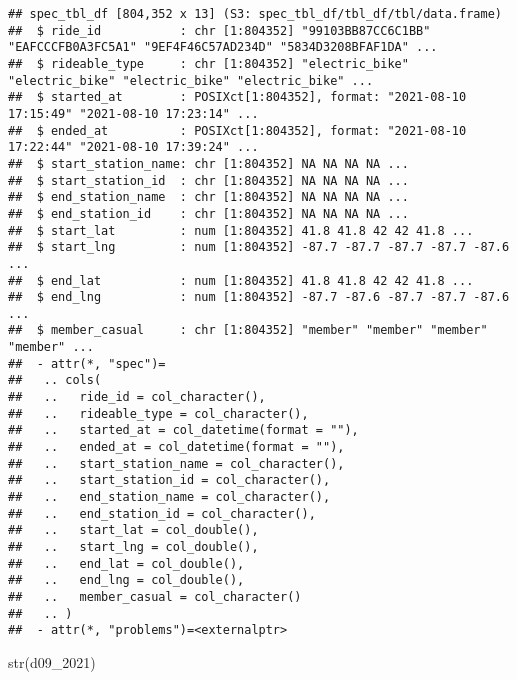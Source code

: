 \documentclass[
]{article}
\newenvironment{Shaded}{\begin{snugshade}}{\end{snugshade}}
\newcommand{\FunctionTok}[1]{\textcolor[rgb]{0.00,0.00,0.00}{#1}}
\newcommand{\NormalTok}[1]{#1}
\begin{document}
\begin{verbatim}
## spec_tbl_df [804,352 x 13] (S3: spec_tbl_df/tbl_df/tbl/data.frame)
##  $ ride_id           : chr [1:804352] "99103BB87CC6C1BB" "EAFCCCFB0A3FC5A1" "9EF4F46C57AD234D" "5834D3208BFAF1DA" ...
##  $ rideable_type     : chr [1:804352] "electric_bike" "electric_bike" "electric_bike" "electric_bike" ...
##  $ started_at        : POSIXct[1:804352], format: "2021-08-10 17:15:49" "2021-08-10 17:23:14" ...
##  $ ended_at          : POSIXct[1:804352], format: "2021-08-10 17:22:44" "2021-08-10 17:39:24" ...
##  $ start_station_name: chr [1:804352] NA NA NA NA ...
##  $ start_station_id  : chr [1:804352] NA NA NA NA ...
##  $ end_station_name  : chr [1:804352] NA NA NA NA ...
##  $ end_station_id    : chr [1:804352] NA NA NA NA ...
##  $ start_lat         : num [1:804352] 41.8 41.8 42 42 41.8 ...
##  $ start_lng         : num [1:804352] -87.7 -87.7 -87.7 -87.7 -87.6 ...
##  $ end_lat           : num [1:804352] 41.8 41.8 42 42 41.8 ...
##  $ end_lng           : num [1:804352] -87.7 -87.6 -87.7 -87.7 -87.6 ...
##  $ member_casual     : chr [1:804352] "member" "member" "member" "member" ...
##  - attr(*, "spec")=
##   .. cols(
##   ..   ride_id = col_character(),
##   ..   rideable_type = col_character(),
##   ..   started_at = col_datetime(format = ""),
##   ..   ended_at = col_datetime(format = ""),
##   ..   start_station_name = col_character(),
##   ..   start_station_id = col_character(),
##   ..   end_station_name = col_character(),
##   ..   end_station_id = col_character(),
##   ..   start_lat = col_double(),
##   ..   start_lng = col_double(),
##   ..   end_lat = col_double(),
##   ..   end_lng = col_double(),
##   ..   member_casual = col_character()
##   .. )
##  - attr(*, "problems")=<externalptr>
\end{verbatim}

\begin{Shaded}
\begin{Highlighting}[]
\FunctionTok{str}\NormalTok{(d09\_2021)}
\end{Highlighting}
\end{Shaded}
\end{document}
